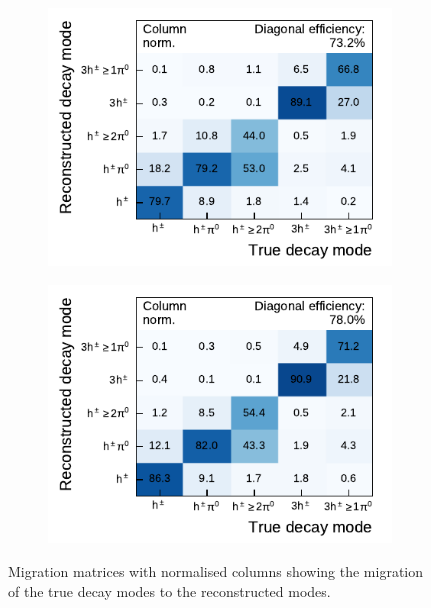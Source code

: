 \begin{figure}[ht]
  \begin{subfigure}[t]{0.48\textwidth}
    \centering
    \includegraphics{./figures/decay_mode_classification/mig_mat_pantau.pdf}
  \end{subfigure}\hfill
  \begin{subfigure}[t]{0.48\textwidth}
    \centering
    \includegraphics{./figures/decay_mode_classification/mig_mat_baseline_ptcut_1_5.pdf}
  \end{subfigure}
  \caption{Migration matrices with normalised columns showing the migration of
    the true decay modes to the reconstructed modes.}
  \label{fig:migmat}
\end{figure}


